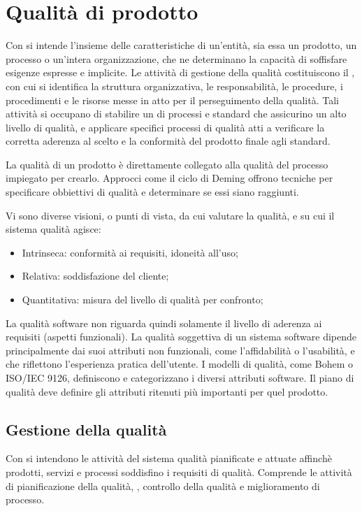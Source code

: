 \section{Qualità di prodotto}
Con  si intende l'insieme delle caratteristiche di un'entità, sia essa un prodotto, un processo o un'intera organizzazione, che ne determinano la capacità di soffisfare esigenze espresse e implicite. Le attività di gestione della qualità costituiscono il , con cui si identifica la struttura organizzativa, le responsabilità, le procedure, i procedimenti e le risorse messe in atto per il perseguimento della qualità. Tali attività  si occupano di stabilire un  di processi e standard che assicurino un alto livello di qualità, e applicare specifici processi di qualità atti a verificare la corretta aderenza al  scelto e la conformità del prodotto finale agli standard.

La qualità di un prodotto è direttamente collegato alla qualità del processo impiegato per crearlo. Approcci come il ciclo di Deming offrono tecniche per specificare obbiettivi di qualità e determinare se essi siano raggiunti.

Vi sono diverse visioni, o punti di vista, da cui valutare la qualità, e su cui il sistema qualità agisce:
\begin{itemize}
	\item Intrinseca: conformità ai requisiti, idoneità all'uso;
	\item Relativa: soddisfazione del cliente;
	\item Quantitativa: misura del livello di qualità per confronto;
\end{itemize}

La qualità software non riguarda quindi solamente il livello di aderenza ai requisiti (aspetti funzionali). La qualità soggettiva di un sistema software dipende principalmente dai suoi attributi non funzionali, come l'affidabilità o l'usabilità, e che riflettono l'esperienza pratica dell'utente. I modelli di qualità, come Bohem o ISO/IEC 9126, definiscono e categorizzano i diversi attributi software. Il piano di qualità deve definire gli attributi ritenuti più importanti per quel prodotto.

\subsection{Gestione della qualità}
Con  si intendono le attività del sistema qualità pianificate e attuate affinchè prodotti, servizi e processi soddisfino i requisiti di qualità. Comprende le attività di pianificazione della qualità, , controllo della qualità e miglioramento di processo.

